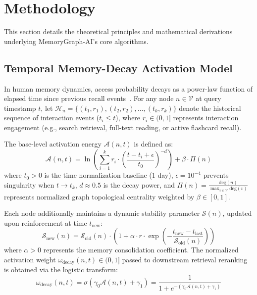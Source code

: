 \section{Methodology}
\label{sec:methodology}

This section details the theoretical principles and mathematical derivations underlying MemoryGraph-AI's core algorithms.

\subsection{Temporal Memory-Decay Activation Model}
In human memory dynamics, access probability decays as a power-law function of elapsed time since previous recall events~\cite{anderson2004actr}. For any node $n \in \mathcal{V}$ at query timestamp $t$, let $\mathcal{H}_n = \{(t_1, r_1), (t_2, r_2), \dots, (t_k, r_k)\}$ denote the historical sequence of interaction events ($t_i \le t$), where $r_i \in (0, 1]$ represents interaction engagement (e.g., search retrieval, full-text reading, or active flashcard recall).

The base-level activation energy $\mathcal{A}(n, t)$ is defined as:
\begin{equation}
\mathcal{A}(n, t) = \ln\left( \sum_{i=1}^{k} r_i \cdot \left(\frac{t - t_i + \epsilon}{t_0}\right)^{-d} \right) + \beta \cdot \Pi(n)
\label{eq:activation}
\end{equation}
where $t_0 > 0$ is the time normalization baseline (1 day), $\epsilon = 10^{-4}$ prevents singularity when $t \to t_k$, $d \approx 0.5$ is the decay power, and $\Pi(n) = \frac{\text{deg}(n)}{\max_{v \in \mathcal{V}}\text{deg}(v)}$ represents normalized graph topological centrality weighted by $\beta \in [0, 1]$.

Each node additionally maintains a dynamic stability parameter $\mathcal{S}(n)$, updated upon reinforcement at time $t_{\text{new}}$:
\begin{equation}
\mathcal{S}_{\text{new}}(n) = \mathcal{S}_{\text{old}}(n) \cdot \left( 1 + \alpha \cdot r \cdot \exp\left( -\frac{t_{\text{new}} - t_{\text{last}}}{\mathcal{S}_{\text{old}}(n)} \right) \right)
\label{eq:stability}
\end{equation}
where $\alpha > 0$ represents the memory consolidation coefficient. The normalized activation weight $\omega_{\text{decay}}(n, t) \in (0, 1]$ passed to downstream retrieval reranking is obtained via the logistic transform:
\begin{equation}
\omega_{\text{decay}}(n, t) = \sigma(\gamma_0 \mathcal{A}(n, t) + \gamma_1) = \frac{1}{1 + e^{-(\gamma_0 \mathcal{A}(n, t) + \gamma_1)}}
\label{eq:decay_weight}
\end{equation}

